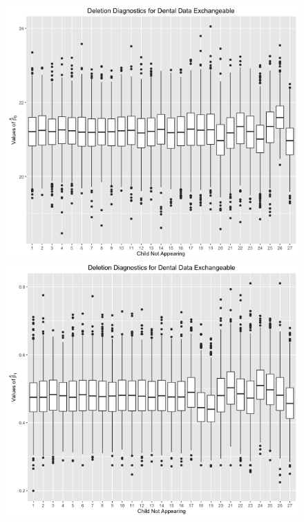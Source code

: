 \documentclass[11pt]{article}
\begin{document}
\begin{enumerate}
\begin{figure}[H]
			\includegraphics[scale=0.4]{RplotDDExchBeta0.png}
			\includegraphics[scale=0.4]{RplotDDExchBeta1.png}

\end{figure}
\end{enumerate}
\end{document}
